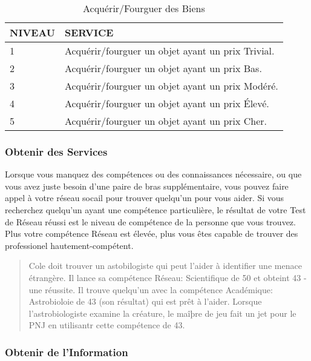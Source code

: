 \begin{table} \caption{Acquérir/Fourguer des Biens} \begin{tabular}{|l|l|} \hline

NIVEAU &SERVICE \\ \hline

1 &Acquérir/fourguer un objet ayant un prix Trivial. \\ \hline

2 &Acquérir/fourguer un objet ayant un prix Bas. \\ \hline

3 &Acquérir/fourguer un objet ayant un prix Modéré. \\ \hline

4 &Acquérir/fourguer un objet ayant un prix Élevé. \\ \hline

5 &Acquérir/fourguer un objet ayant un prix Cher. \\ \hline

\end{tabular} \end{table} 

\subsubsection{Obtenir des Services} 

Lorsque vous manquez des compétences ou des connaissances nécessaire, ou que vous avez juste besoin d'une paire de bras supplémentaire, vous pouvez faire appel à votre réseau socail pour trouver quelqu'un pour vous aider. Si vous recherchez quelqu'un ayant une compétence particulière, le résultat de votre Test de Réseau réussi est le niveau de compétence de la personne que vous trouvez. Plus votre compétence Réseau est élevée, plus vous êtes capable de trouver des professionel hautement-compétent. 

\begin{quotation} Cole doit trouver un astobilogiste qui peut l'aider à identifier une menace étrangère. Il lance sa compétence Réseau: Scientifique de 50 et obteint 43 - une réussite. Il trouve quelqu'un avec la compétence Académique: Astrobioloie de 43 (son résultat) qui est prêt à l'aider. Lorsque l'astrobiologiste examine la créature, le maîþre de jeu fait un jet pour le PNJ en utilisantr cette compétence de 43. \end{quotation} 

\subsubsection{Obtenir de l'Information} 

